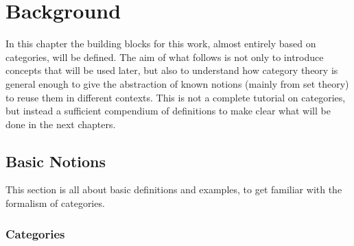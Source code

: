 \documentclass[a4paper, twoside,openright]{report}
\theoremstyle{plain}
\theoremstyle{definition}
\begin{document}
\newcommand{\cat}[1]{\mathscr{#1}}
\newcommand{\Ob}{\mathcal{O}b}
\newcommand{\Hom}{\mathcal{H}om}
\newcommand{\Set}{\mathbf{Set}}
\newcommand{\Reg}{\mathcal{R}eg}
\newcommand{\Mono}{\mathcal{M}ono}
\newcommand{\initial}{\textbf 0}
\newcommand{\terminal}{\mathds{1}}

% 

\tableofcontents


\chapter{Background}
In this chapter the building blocks for this work, almost entirely based on categories, will be defined.
The aim of what follows is not only to introduce concepts that will be used later, but also to understand how category theory is general enough to give the abstraction of known notions (mainly from set theory) to reuse them in different contexts. This is not a complete tutorial on categories, but instead a sufficient compendium of definitions to make clear what will be done in the next chapters.

\section{Basic Notions}\label{sect:basic_nots}


This section is all about basic definitions and examples, to get familiar with the formalism of categories.

\subsection{Categories}\label{ssect:cats}
\end{document}
